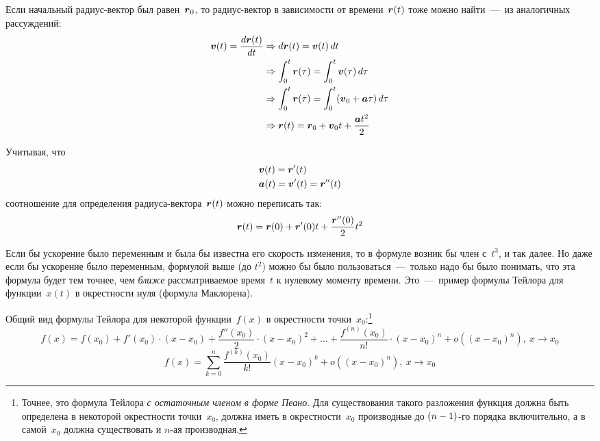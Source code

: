 \documentclass[a4paper,12pt]{article}
\newcommand{\diff}{\mathop{}\!d}
\begin{document}
  Если начальный радиус-вектор был равен~$\boldsymbol r_0$, то радиус-вектор в зависимости от времени~$\boldsymbol r(t)$ тоже можно найти~---~из аналогичных рассуждений:
  \begin{equation*}
  \begin{split}
    \bds v(t) = \frac{\diff \bds r(t)}{\diff t} &\Rightarrow \diff \bds r(t) = \bds v(t) \diff t\\
    &\Rightarrow \int_0^t \bds r(\tau) = \int_0^t \bds v(\tau) \diff \tau\\
    &\Rightarrow \int_0^t \bds r(\tau) = \int_0^t (\bds v_0 + \bds a \tau) \diff \tau\\
    &\Rightarrow \bds r(t) = \bds r_0 + \bds v_0 t + \frac{\bds a t^2}{2}
  \end{split}
  \end{equation*}

  Учитывая, что
  \[
    \begin{aligned}
      &\boldsymbol v(t) = \boldsymbol r'(t)\\
      &\boldsymbol a(t) = \boldsymbol v'(t) = \boldsymbol r''(t)
    \end{aligned}
  \]
  соотношение для определения радиуса-вектора~$\boldsymbol r(t)$ можно переписать так:
  \[
    \boldsymbol r(t) = \boldsymbol r(0) + \boldsymbol r'(0) t + \frac{\boldsymbol r''(0)}{2}t^2
  \]

  Если бы ускорение было переменным и была бы известна его скорость изменения, то в формуле возник бы член с~$t^3$, и так далее.
  Но даже если бы ускорение было переменным, формулой выше (до $t^2$) можно бы было пользоваться~---~только надо бы было понимать, что эта формула будет тем точнее, чем \emph{ближе} рассматриваемое время~$t$ к нулевому моменту времени.
  Это~---~пример формулы Тейлора для функции~$x(t)$ в окрестности нуля (формула Маклорена).

  Общий вид формулы Тейлора для некоторой функции~$f(x)$ в окрестности точки~$x_0$:\footnote{
    Точнее, это формула Тейлора \emph{с остаточным членом в форме Пеано}.
    Для существования такого разложения функция должна быть определена в некоторой окрестности точки~$x_0$, должна иметь в окрестности~$x_0$ производные до $(n \hm- 1)$-го порядка включительно, а в самой~$x_0$ должна существовать и $n$-ая производная.
  }
  \[
    f(x) = f(x_0) + f'(x_0) \cdot (x - x_0) + \frac{f''(x_0)}{2} \cdot (x - x_0)^2 + \ldots + \frac{f^{(n)}(x_0)}{n!} \cdot (x - x_0)^n + o((x - x_0)^n),\ x \to x_0
  \]
  \begin{equation}
    f(x) = \sum_{k = 0}^n \frac{f^{(k)}(x_0)}{k!} (x - x_0)^k + o((x - x_0)^n),\ x \to x_0
  \end{equation}
\end{document}
